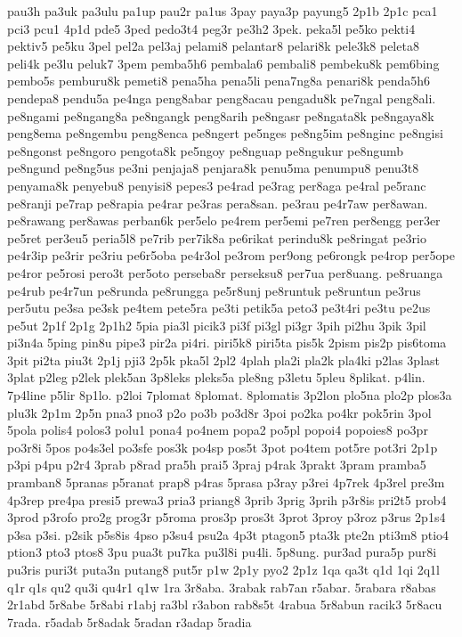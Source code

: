{pau3h pa3uk pa3ulu pa1up pau2r pa1us 3pay paya3p payung5 2p1b 2p1c pca1
pci3 pcu1 4p1d pde5 3ped pedo3t4 peg3r pe3h2 3pek. peka5l pe5ko pekti4
pektiv5 pe5ku 3pel pel2a pel3aj pelami8 pelantar8 pelari8k pele3k8 peleta8
peli4k pe3lu peluk7 3pem pemba5h6 pembala6 pembali8 pembeku8k pem6bing
pembo5s pemburu8k pemeti8 pena5ha pena5li pena7ng8a penari8k penda5h6
pendepa8 pendu5a pe4nga peng8abar peng8acau pengadu8k pe7ngal peng8ali.
pe8ngami pe8ngang8a pe8ngangk peng8arih pe8ngasr pe8ngata8k pe8ngaya8k
peng8ema pe8ngembu peng8enca pe8ngert pe5nges pe8ng5im pe8nginc pe8ngisi
pe8ngonst pe8ngoro pengota8k pe5ngoy pe8nguap pe8ngukur pe8ngumb pe8ngund
pe8ng5us pe3ni penjaja8 penjara8k penu5ma penumpu8 penu3t8 penyama8k
penyebu8 penyisi8 pepes3 pe4rad pe3rag per8aga pe4ral pe5ranc pe8ranji
pe7rap pe8rapia pe4rar pe3ras pera8san. pe3rau pe4r7aw per8awan. pe8rawang
per8awas perban6k per5elo pe4rem per5emi pe7ren per8engg per3er pe5ret
per3eu5 peria5l8 pe7rib per7ik8a pe6rikat perindu8k pe8ringat pe3rio
pe4r3ip pe3rir pe3riu pe6r5oba pe4r3ol pe3rom per9ong pe6rongk pe4rop
per5ope pe4ror pe5rosi pero3t per5oto perseba8r perseksu8 per7ua per8uang.
pe8ruanga pe4rub pe4r7un pe8runda pe8rungga pe5r8unj pe8runtuk pe8runtun
pe3rus per5utu pe3sa pe3sk pe4tem pete5ra pe3ti petik5a peto3 pe3t4ri
pe3tu pe2us pe5ut 2p1f 2p1g 2p1h2 5pia pia3l picik3 pi3f pi3gl pi3gr 3pih
pi2hu 3pik 3pil pi3n4a 5ping pin8u pipe3 pir2a pi4ri. piri5k8 piri5ta
pis5k 2pism pis2p pis6toma 3pit pi2ta piu3t 2p1j pji3 2p5k pka5l 2pl2
4plah pla2i pla2k pla4ki p2las 3plast 3plat p2leg p2lek plek5an 3p8leks
pleks5a ple8ng p3letu 5pleu 8plikat. p4lin. 7p4line p5lir 8p1lo. p2loi
7plomat 8plomat. 8plomatis 3p2lon plo5na plo2p plos3a plu3k 2p1m 2p5n pna3
pno3 p2o po3b po3d8r 3poi po2ka po4kr pok5rin 3pol 5pola polis4 polos3
polu1 pona4 po4nem popa2 po5pl popoi4 popoies8 po3pr po3r8i 5pos po4s3el
po3sfe pos3k po4sp pos5t 3pot po4tem pot5re pot3ri 2p1p p3pi p4pu p2r4
3prab p8rad pra5h prai5 3praj p4rak 3prakt 3pram pramba5 pramban8 5pranas
p5ranat prap8 p4ras 5prasa p3ray p3rei 4p7rek 4p3rel pre3m 4p3rep pre4pa
presi5 prewa3 pria3 priang8 3prib 3prig 3prih p3r8is pri2t5 prob4 3prod
p3rofo pro2g prog3r p5roma pros3p pros3t 3prot 3proy p3roz p3rus 2p1s4
p3sa p3si. p2sik p5s8is 4pso p3su4 psu2a 4p3t ptagon5 pta3k pte2n pti3m8
ptio4 ption3 pto3 ptos8 3pu pua3t pu7ka pu3l8i pu4li. 5p8ung. pur3ad
pura5p pur8i pu3ris puri3t puta3n putang8 put5r p1w 2p1y pyo2 2p1z 1qa
qa3t q1d 1qi 2q1l q1r q1s qu2 qu3i qu4r1 q1w 1ra 3r8aba. 3rabak rab7an
r5abar. 5rabara r8abas 2r1abd 5r8abe 5r8abi r1abj ra3bl r3abon rab8s5t
4rabua 5r8abun racik3 5r8acu 7rada. r5adab 5r8adak 5radan r3adap 5radia
}
